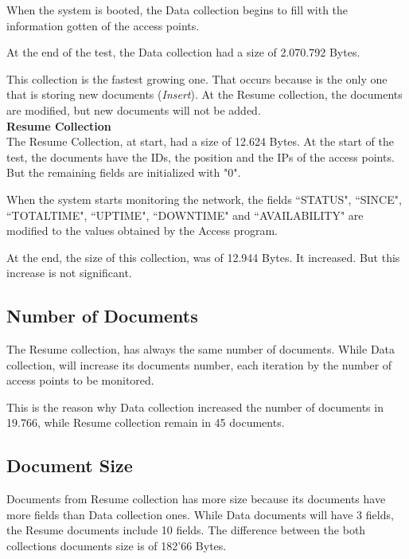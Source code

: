 \documentclass[12pt, a4paper,twoside]{tesi_upf}
\begin{document}
    When the system is booted, the Data collection begins to fill with the information gotten of the access points.
    
    At the end of the test, the Data collection had a size of 2.070.792 Bytes. 
    
    This collection is the fastest growing one. That occurs because is the only one that is storing new documents (\textit{Insert}). At the Resume collection, the documents are modified, but new documents will not be added.\\
    
    \textbf{Resume Collection}\\
    The Resume Collection, at start, had a size of 12.624 Bytes.
    At the start of the test, the documents have the IDs, the position and the IPs of the access points. But the remaining fields are initialized with "0".
    
    When the system starts monitoring the network, the fields ``STATUS", ``SINCE", ``TOTALTIME", ``UPTIME", ``DOWNTIME" and ``AVAILABILITY" are modified to the values obtained by the Access program.
    
    At the end, the size of this collection, was of 12.944 Bytes. It increased. But this increase is not significant.

    \subsection{Number of Documents}
    
    The Resume collection, has always the same number of documents.
    While Data collection, will increase its documents number, each iteration by the number of access points to be monitored.
    
    This is the reason why Data collection increased the number of documents in 19.766, while Resume collection remain in 45 documents.
    
    \subsection{Document Size}
    
    Documents from Resume collection has more size because its documents have more fields than Data collection ones. While Data documents will have 3 fields, the Resume documents include 10 fields. 
    The difference between the both collections documents size is of 182'66 Bytes.
\end{document}
